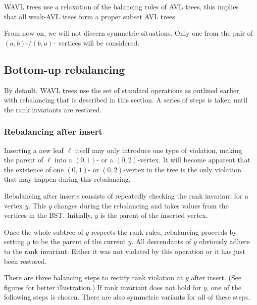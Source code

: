 WAVL trees use a relaxation of the balancing rules of AVL trees, this implies that all weak-AVL trees form a proper subset AVL trees.

From now on, we will not discern symmetric situations. Only one from the pair of $(a,b)$-/$(b,a)$- vertices will be considered.

\subsection{Bottom-up rebalancing}

By default, WAVL trees use the set of standard operations as outlined earlier with rebalancing that is described in this section. A series of steps is taken until the rank invariants are restored.


\subsubsection*{Rebalancing after insert}

Inserting a new leaf $\ell$ itself may only introduce one type of violation, making the parent of $\ell$ into a $(0,1)$- or a $(0,2)$-vertex. It will become apparent that the existence of one $(0,1)$- or $(0,2)$-vertex in the tree is the only violation that may happen during this rebalancing. 

Rebalancing after inserts consists of repeatedly checking the rank invariant for a vertex $y$. This $y$ changes during the rebalancing and takes values from the vertices in the BST. Initially, $y$ is the parent of the inserted vertex. 

Once the whole subtree of $y$ respects the rank rules, rebalancing proceeds by setting $y$ to be the parent of the current $y$. All descendants of $y$ obviously adhere to the rank invariant. Either it was not violated by this operation or it has just been restored. 

There are three balancing steps to rectify rank violation at $y$ after insert. (See figures for better illustration.) If rank invariant does not hold for $y$, one of the following steps is chosen. There are also symmetric variants for all of these steps. 

